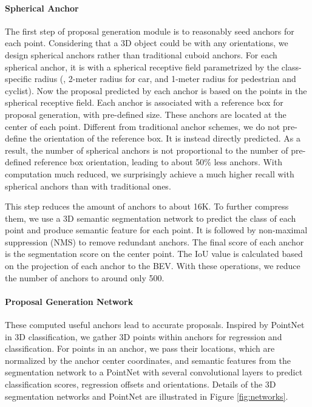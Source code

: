 \documentclass[10pt,twocolumn,letterpaper]{article}
\begin{document}
\vspace{-0.1in}
\paragraph{Spherical Anchor} The first step of proposal generation module is to reasonably seed anchors for each point. Considering that a 3D object could be with any orientations, we design spherical anchors rather than traditional cuboid anchors. For each spherical anchor, it is with a spherical receptive field parametrized by the class-specific radius (\ie, 2-meter radius for car, and 1-meter radius for pedestrian and cyclist). Now the proposal predicted by each anchor is based on the points in the spherical receptive field. Each anchor is associated with a reference box for proposal generation, with pre-defined size. These anchors are located at the center of each point. Different from traditional anchor schemes, we do not pre-define the orientation of the reference box. It is instead directly predicted. As a result, the number of spherical anchors is not proportional to the number of pre-defined reference box orientation, leading to about 50\% less anchors. With computation much reduced, we surprisingly achieve a much higher recall with spherical anchors than with traditional ones.


This step reduces the amount of anchors to about 16K. To further compress them, we use a 3D semantic segmentation network to predict the class of each point and produce semantic feature for each point. It is followed by non-maximal suppression (NMS) to remove redundant anchors.
The final score of each anchor is the segmentation score on the center point. The IoU value is calculated based on the projection of each anchor to the BEV. With these operations, we reduce the number of anchors to around only 500.

\vspace{-0.1in}
\paragraph{Proposal Generation Network}
\label{paragraph_proposla_generation_network}
These computed useful anchors lead to accurate proposals. Inspired by PointNet \cite{POINTNET} in 3D classification, we gather 3D points within anchors for regression and classification. For points in an anchor, we pass their  locations, which are normalized by the anchor center coordinates, and semantic features from the segmentation network to a PointNet with several convolutional layers to predict classification scores, regression offsets and orientations. Details of the 3D segmentation networks and PointNet are illustrated in Figure \ref{fig:networks}. 
\end{document}
